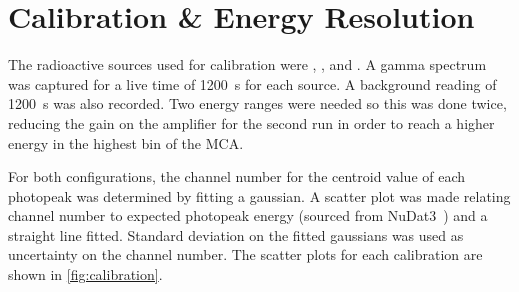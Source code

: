 \documentclass[11pt]{article}
\numberwithin{equation}{section}
\numberwithin{figure}{section}
\numberwithin{table}{section}
\begin{document}
\section{Calibration \& Energy Resolution}\label{sec:CalibrationResolution}
The radioactive sources used for calibration were , , and . A gamma spectrum was captured for a live time of \SI{1200}{\second} for each source. A background reading of \SI{1200}{\second} was also recorded. Two energy ranges were needed so this was done twice, reducing the gain on the amplifier for the second run in order to reach a higher energy in the highest bin of the MCA. 

For both configurations, the channel number for the centroid value of each photopeak was determined by fitting a gaussian. A scatter plot was made relating channel number to expected photopeak energy (sourced from NuDat3~\cite{nudat}) and a straight line fitted. Standard deviation on the fitted gaussians was used as uncertainty on the channel number. The scatter plots for each calibration are shown in \cref{fig:calibration}.
\end{document}
